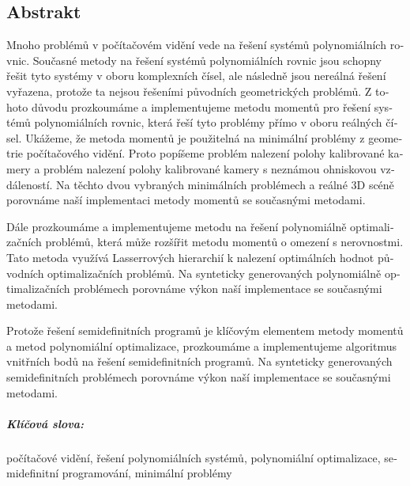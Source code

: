 \begin{otherlanguage}{czech}
\chapter*{Abstrakt}
Mnoho problémů v počítačovém vidění vede na řešení systémů polynomiálních rovnic.
Současné metody na řešení systémů polynomiálních rovnic jsou schopny řešit tyto systémy v oboru komplexních čísel, ale následně jsou nereálná řešení vyřazena, protože ta nejsou řešeními původních geometrických problémů.
Z tohoto důvodu prozkoumáme a implementujeme metodu momentů pro řešení systémů polynomiálních rovnic, která řeší tyto problémy přímo v oboru reálných čísel.
Ukážeme, že metoda momentů je použitelná na minimální problémy z geometrie počítačového vidění.
Proto popíšeme problém nalezení polohy kalibrované kamery a problém nalezení polohy kalibrované kamery s neznámou ohniskovou vzdáleností.
Na těchto dvou vybraných minimálních problémech a reálné 3D scéně porovnáme naší implementaci metody momentů se sou\-čas\-ný\-mi metodami.

Dále prozkoumáme a implementujeme metodu na řešení polynomiálně optimalizačních problémů, která může rozšířit metodu momentů o omezení s nerovnostmi.
Tato metoda využívá Lasserrových hierarchií k nalezení optimálních hodnot původních optimalizačních problémů.
Na synteticky generovaných polynomiálně optimalizačních prob\-lé\-mech porovnáme výkon naší implementace se současnými metodami.

Protože řešení semidefinitních programů je klíčovým elementem metody momentů a metod polynomiální optimalizace, prozkoumáme a implementujeme algoritmus vnitřních bodů na řešení semidefinitních programů.
Na synteticky generovaných semidefinitních problémech porovnáme výkon naší implementace se současnými metodami.

\paragraph{Klíčová slova:}
počítačové vidění, řešení polynomiálních systémů, polynomiální optimalizace, semidefinitní programování, minimální problémy
\end{otherlanguage}
